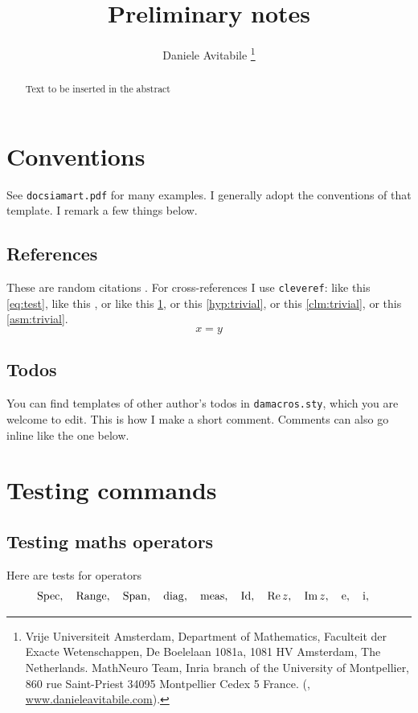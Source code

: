 \documentclass[a4paper,baskervaldx]{daarticle}
\title{Preliminary notes}
\author{%
  Daniele Avitabile%
  \thanks{%
    Vrije Universiteit Amsterdam,
    Department of Mathematics,
    Faculteit der Exacte Wetenschappen,
    De Boelelaan 1081a,
    1081 HV Amsterdam, The Netherlands.
  \protect
    MathNeuro Team,
    Inria branch of the University of Montpellier,
    860 rue Saint-Priest
    34095 Montpellier Cedex 5
    France.
  \protect
    (\email{d.avitabile@vu.nl}, \url{www.danieleavitabile.com}).
  }
}
\begin{document}
\maketitle

\begin{abstract}
  Text to be inserted in the abstract
\end{abstract}

\section{Conventions} \label{sec:conventions}
See \texttt{docsiamart.pdf} for many examples. I generally adopt the conventions of
that template. I remark a few things below.

\subsection{References} \label{sec:references}
These are random citations \cite{KoMa14,siam}. For cross-references I use
\texttt{cleveref}: like this
\cref{eq:test}, like this , or like this \cref{sec:conventions}, or
this \cref{hyp:trivial}, or this \cref{clm:trivial}, or this \cref{asm:trivial}.
\begin{equation}\label{eq:test}
  x = y
\end{equation}


\subsection{Todos}
You can find templates of other author's todos in
\texttt{damacros.sty}, which you are welcome to edit.
This is how I make a short comment. Comments can also go
inline like the one below.
% 

\section{Testing commands}

\subsection{Testing maths operators}
Here are tests for operators
\[
  \operatorname{Spec}, \quad 
  \operatorname{Range}, \quad 
  \operatorname{Span}, \quad
  \operatorname{diag}, \quad
  \operatorname{meas}, \quad
  \operatorname{Id}, \quad
  \operatorname{Re} z, \quad
  \operatorname{Im} z, \quad
  \operatorname{e}, \quad
  \operatorname{i}, \quad
\]
\end{document}
